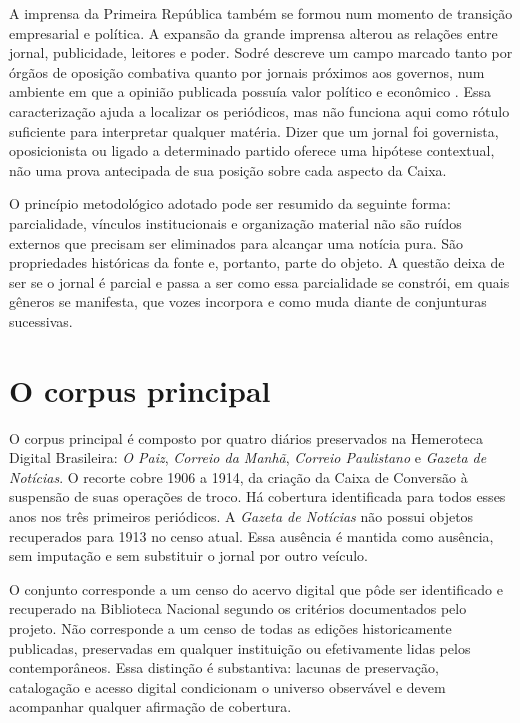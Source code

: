 A imprensa da Primeira República também se formou num momento de transição empresarial e política. A expansão da grande imprensa alterou as relações entre jornal, publicidade, leitores e poder. Sodré descreve um campo marcado tanto por órgãos de oposição combativa quanto por jornais próximos aos governos, num ambiente em que a opinião publicada possuía valor político e econômico \cite{sodre1966}. Essa caracterização ajuda a localizar os periódicos, mas não funciona aqui como rótulo suficiente para interpretar qualquer matéria. Dizer que um jornal foi governista, oposicionista ou ligado a determinado partido oferece uma hipótese contextual, não uma prova antecipada de sua posição sobre cada aspecto da Caixa.

O princípio metodológico adotado pode ser resumido da seguinte forma: parcialidade, vínculos institucionais e organização material não são ruídos externos que precisam ser eliminados para alcançar uma notícia pura. São propriedades históricas da fonte e, portanto, parte do objeto. A questão deixa de ser se o jornal é parcial e passa a ser como essa parcialidade se constrói, em quais gêneros se manifesta, que vozes incorpora e como muda diante de conjunturas sucessivas.

\section{O corpus principal}

O corpus principal é composto por quatro diários preservados na Hemeroteca Digital Brasileira: \textit{O Paiz}, \textit{Correio da Manhã}, \textit{Correio Paulistano} e \textit{Gazeta de Notícias}. O recorte cobre 1906 a 1914, da criação da Caixa de Conversão à suspensão de suas operações de troco. Há cobertura identificada para todos esses anos nos três primeiros periódicos. A \textit{Gazeta de Notícias} não possui objetos recuperados para 1913 no censo atual. Essa ausência é mantida como ausência, sem imputação e sem substituir o jornal por outro veículo.

O conjunto corresponde a um censo do acervo digital que pôde ser identificado e recuperado na Biblioteca Nacional segundo os critérios documentados pelo projeto. Não corresponde a um censo de todas as edições historicamente publicadas, preservadas em qualquer instituição ou efetivamente lidas pelos contemporâneos. Essa distinção é substantiva: lacunas de preservação, catalogação e acesso digital condicionam o universo observável e devem acompanhar qualquer afirmação de cobertura.

